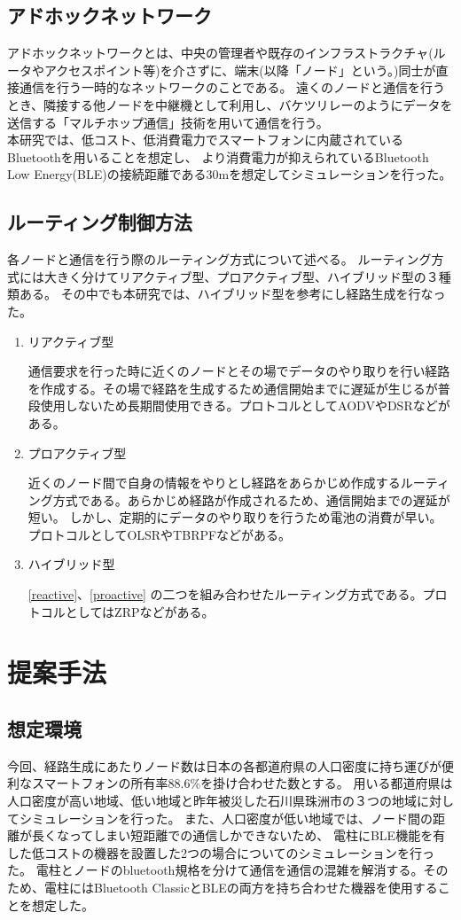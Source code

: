 \documentclass[a4paper, 9pt]{ltjsarticle}
\begin{document}
\subsection{アドホックネットワーク}
アドホックネットワークとは、中央の管理者や既存のインフラストラクチャ(ルータやアクセスポイント等)を介さずに、端末(以降「ノード」という。)同士が直接通信を行う一時的なネットワークのことである。
遠くのノードと通信を行うとき、隣接する他ノードを中継機として利用し、バケツリレーのようにデータを送信する「マルチホップ通信」技術を用いて通信を行う。%
\\ \indent 本研究では、低コスト、低消費電力でスマートフォンに内蔵されているBluetoothを用いることを想定し、
より消費電力が抑えられているBluetooth Low Energy(BLE)の接続距離である30mを想定してシミュレーションを行った。

\subsection{ルーティング制御方法}
各ノードと通信を行う際のルーティング方式について述べる。
ルーティング方式には大きく分けてリアクティブ型、プロアクティブ型、ハイブリッド型の３種類ある。
その中でも本研究では、ハイブリッド型を参考にし経路生成を行なった。
\begin{enumerate}
  \item \label{reactive} リアクティブ型 \par  
  通信要求を行った時に近くのノードとその場でデータのやり取りを行い経路を作成する。その場で経路を生成するため通信開始までに遅延が生じるが普段使用しないため長期間使用できる。プロトコルとしてAODVやDSRなどがある。

  \item \label{proactive} プロアクティブ型 \par
  近くのノード間で自身の情報をやりとし経路をあらかじめ作成するルーティング方式である。あらかじめ経路が作成されるため、通信開始までの遅延が短い。  
  しかし、定期的にデータのやり取りを行うため電池の消費が早い。プロトコルとしてOLSRやTBRPFなどがある。

  \item ハイブリッド型 \par
  \ref{reactive}、\ref{proactive} の二つを組み合わせたルーティング方式である。プロトコルとしてはZRPなどがある。
\end{enumerate}

\section{提案手法}
\subsection{想定環境}
今回、経路生成にあたりノード数は日本の各都道府県の人口密度に持ち運びが便利なスマートフォンの所有率88.6\%\cite{スマホ保有率}を掛け合わせた数とする。%
用いる都道府県は人口密度が高い地域、低い地域と昨年被災した石川県珠洲市の３つの地域に対してシミュレーションを行った。
また、人口密度が低い地域では、ノード間の距離が長くなってしまい短距離での通信しかできないため、
電柱にBLE機能を有した低コストの機器を設置した2つの場合についてのシミュレーションを行った。
電柱とノードのbluetooth規格を分けて通信を通信の混雑を解消する。そのため、電柱にはBluetooth ClassicとBLEの両方を持ち合わせた機器を使用することを想定した。
\end{document}
